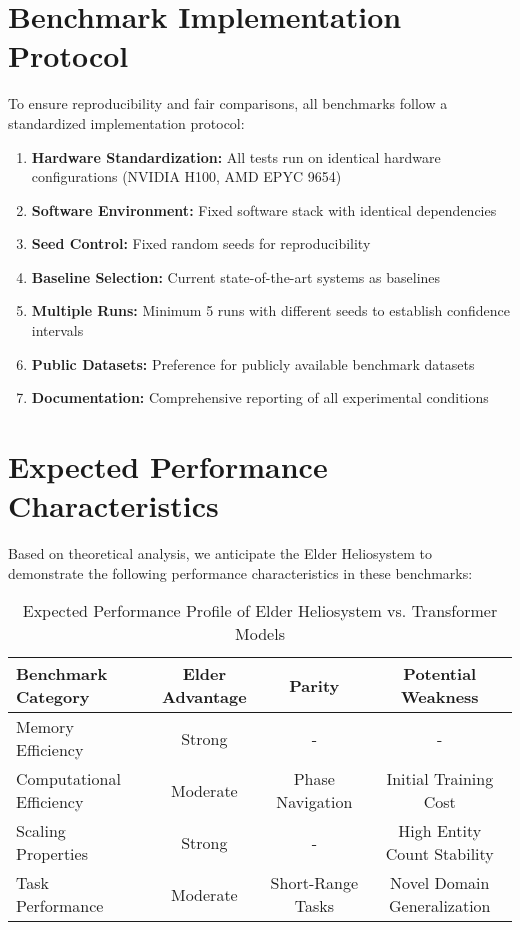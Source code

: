 \section{Benchmark Implementation Protocol}

To ensure reproducibility and fair comparisons, all benchmarks follow a standardized implementation protocol:

\begin{enumerate}
    \item \textbf{Hardware Standardization:} All tests run on identical hardware configurations (NVIDIA H100, AMD EPYC 9654)
    \item \textbf{Software Environment:} Fixed software stack with identical dependencies
    \item \textbf{Seed Control:} Fixed random seeds for reproducibility
    \item \textbf{Baseline Selection:} Current state-of-the-art systems as baselines
    \item \textbf{Multiple Runs:} Minimum 5 runs with different seeds to establish confidence intervals
    \item \textbf{Public Datasets:} Preference for publicly available benchmark datasets
    \item \textbf{Documentation:} Comprehensive reporting of all experimental conditions
\end{enumerate}

\section{Expected Performance Characteristics}

Based on theoretical analysis, we anticipate the Elder Heliosystem to demonstrate the following performance characteristics in these benchmarks:

\begin{table}[h]
\centering
\begin{tabular}{|l|c|c|c|}
\hline
\textbf{Benchmark Category} & \textbf{Elder Advantage} & \textbf{Parity} & \textbf{Potential Weakness} \\
\hline
Memory Efficiency & Strong & - & - \\
\hline
Computational Efficiency & Moderate & Phase Navigation & Initial Training Cost \\
\hline
Scaling Properties & Strong & - & High Entity Count Stability \\
\hline
Task Performance & Moderate & Short-Range Tasks & Novel Domain Generalization \\
\hline
\end{tabular}
\caption{Expected Performance Profile of Elder Heliosystem vs. Transformer Models}
\end{table}

